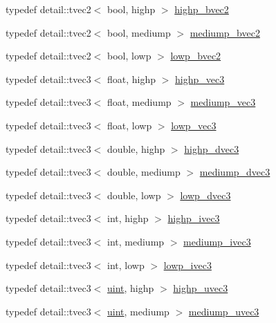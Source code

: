 \begin{CompactItemize}
\item 
typedef detail::tvec2$<$ bool, highp $>$ \hyperlink{group__core__precision_g4153415d1f3d390219ac9464652ac377}{highp\_\-bvec2}
\item 
typedef detail::tvec2$<$ bool, mediump $>$ \hyperlink{group__core__precision_g1406d96eb96694d91052d3f882658ab2}{mediump\_\-bvec2}
\item 
typedef detail::tvec2$<$ bool, lowp $>$ \hyperlink{group__core__precision_g8ff6222d4bb4245106dab0727c8e8a45}{lowp\_\-bvec2}
\item 
typedef detail::tvec3$<$ float, highp $>$ \hyperlink{group__core__precision_g4879124da7a18d6b681d933cb8c4267d}{highp\_\-vec3}
\item 
typedef detail::tvec3$<$ float, mediump $>$ \hyperlink{group__core__precision_g10acc767a046b85205f52ce7f834626f}{mediump\_\-vec3}
\item 
typedef detail::tvec3$<$ float, lowp $>$ \hyperlink{group__core__precision_g062795097526e2758d34cb38387dd82d}{lowp\_\-vec3}
\item 
typedef detail::tvec3$<$ double, highp $>$ \hyperlink{group__core__precision_g4962711854156dae8ebb4eb39237c542}{highp\_\-dvec3}
\item 
typedef detail::tvec3$<$ double, mediump $>$ \hyperlink{group__core__precision_gc051f0702cb0e717db5dd913f6261388}{mediump\_\-dvec3}
\item 
typedef detail::tvec3$<$ double, lowp $>$ \hyperlink{group__core__precision_g9bdb864f7242863e1227e3209f5b2dc4}{lowp\_\-dvec3}
\item 
typedef detail::tvec3$<$ int, highp $>$ \hyperlink{group__core__precision_ge9f0a321de8ee92dce9d4400362d71e7}{highp\_\-ivec3}
\item 
typedef detail::tvec3$<$ int, mediump $>$ \hyperlink{group__core__precision_g520d24fa0ea887284b80a02c062ca7b8}{mediump\_\-ivec3}
\item 
typedef detail::tvec3$<$ int, lowp $>$ \hyperlink{group__core__precision_gd133fec5c629e3f712c1270e15144e6c}{lowp\_\-ivec3}
\item 
typedef detail::tvec3$<$ \hyperlink{group__core__precision_g4fd29415871152bfb5abd588334147c8}{uint}, highp $>$ \hyperlink{group__core__precision_g66d0e4ae1742ede2eb32bf0bfedd7474}{highp\_\-uvec3}
\item 
typedef detail::tvec3$<$ \hyperlink{group__core__precision_g4fd29415871152bfb5abd588334147c8}{uint}, mediump $>$ \hyperlink{group__core__precision_gebdefe98b08421ef645f65c706af46b2}{mediump\_\-uvec3}
\item 

\end{CompactItemize}
